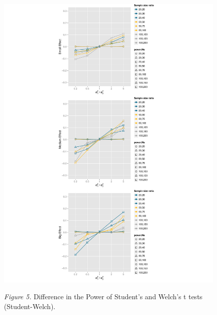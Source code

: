 \documentclass[man,a4paper,noextraspace,apacite]{apa6}
\begin{document}
\begin{figure}
\includegraphics{WelchManuscript-MASTER-plotPowerDiff}

\textit{Figure 5.} Difference in the Power of Student's and Welch's t tests (Student-Welch).
\end{figure}
\end{document}
